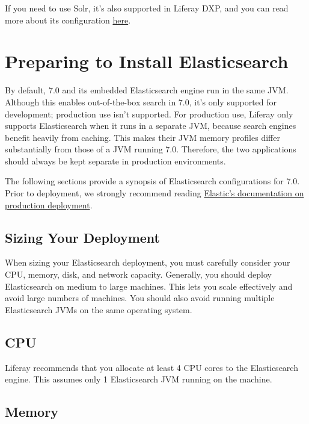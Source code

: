 If you need to use Solr, it's also supported in Liferay DXP, and you can
read more about its configuration
\href{/docs/7-0/deploy/-/knowledge_base/d/using-solr}{here}.

\section{Preparing to Install
Elasticsearch}\label{preparing-to-install-elasticsearch}

By default, 7.0 and its embedded Elasticsearch engine run in the same
JVM. Although this enables out-of-the-box search in 7.0, it's only
supported for development; production use isn't supported. For
production use, Liferay only supports Elasticsearch when it runs in a
separate JVM, because search engines benefit heavily from caching. This
makes their JVM memory profiles differ substantially from those of a JVM
running 7.0. Therefore, the two applications should always be kept
separate in production environments.

The following sections provide a synopsis of Elasticsearch
configurations for 7.0. Prior to deployment, we strongly recommend
reading
\href{https://www.elastic.co/guide/en/elasticsearch/guide/current/index.html}{Elastic's
documentation on production deployment}.

\subsection{Sizing Your Deployment}\label{sizing-your-deployment}

When sizing your Elasticsearch deployment, you must carefully consider
your CPU, memory, disk, and network capacity. Generally, you should
deploy Elasticsearch on medium to large machines. This lets you scale
effectively and avoid large numbers of machines. You should also avoid
running multiple Elasticsearch JVMs on the same operating system.

\subsection{CPU}\label{cpu}

Liferay recommends that you allocate at least 4 CPU cores to the
Elasticsearch engine. This assumes only 1 Elasticsearch JVM running on
the machine.

\subsection{Memory}\label{memory}

